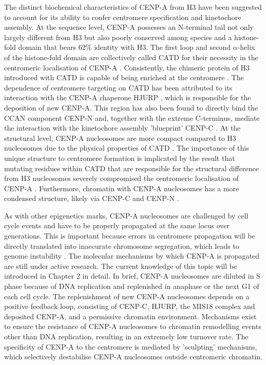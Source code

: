 The distinct biochemical characteristics of CENP-A from H3 have been suggested to account for its ability to confer centromere specification and kinetochore assembly. At the sequence level, CENP-A possesses an N-terminal tail not only largely different from H3 \citep{Sullivan1994HumanCentromere.} but also poorly conserved among species \citep{Goutte-Gattat2013PhosphorylationFunction} and a histone-fold domain that bears 62\% identity with H3. The first loop and second $\alpha$-helix of the histone-fold domain are collectively called CATD for their necessity in the centromeric localisation of CENP-A \citep{Black2007}. Consistently, the chimeric protein of H3 introduced with CATD is capable of being enriched at the centromere \citep{Black2007a}. The dependence of centromere targeting on CATD has been attributed to its interaction with the CENP-A chaperone HJURP \citep{Zhou2011StructuralScm3, Bassett2012, Hu2011StructureHJURP, Shuaib2010HJURPCentromeres}, which is responsible for the deposition of new CENP-A. This region has also been found to directly bind the CCAN component CENP-N \citep{Logsdon2015, Carroll2010, Carroll2009} and, together with the extreme C-terminus, mediate the interaction with the kinetochore assembly 'blueprint' CENP-C \citep{Carroll2010, Kato2013Spt6H3, Guse2011, Walstein2021}. At the structural level, CENP-A nucleosomes are more compact compared to H3 nucleosomes due to the physical properties of CATD \citep{Black2004, Sekulic2010}. The importance of this unique structure to centromere formation is implicated by the result that mutating residues within CATD that are responsible for the structural difference from H3 nucleosomes severely compromised the centromeric localisation of CENP-A \citep{Sekulic2010}. Furthermore, chromatin with CENP-A nucleosomes has a more condensed structure, likely via CENP-C and CENP-N \citep{Panchenko2011, Geiss2014, Zhou2022}. 

As with other epigenetics marks, CENP-A nucleosomes are challenged by cell cycle events and have to be properly propagated at the same locus over generations. This is important because errors in centromere propagation will be directly translated into inaccurate chromosome segregation, which leads to genome instability \citep{McClintock1939TheMeiosis, Koshland1987ACerevisiae}. The molecular mechanisms by which CENP-A is propagated are still under active research. The current knowledge of this topic will be introduced in Chapter 2 in detail. In brief, CENP-A nucleosomes are diluted in S phase because of DNA replication and replenished in anaphase or the next G1 of each cell cycle. The replenishment of new CENP-A nucleosomes depends on a positive feedback loop, consisting of CENP-C, HJURP, the MIS18 complex and deposited CENP-A, and a permissive chromatin environment. Mechanisms exist to ensure the resistance of CENP-A nucleosomes to chromatin remodelling events other than DNA replication, resulting in an extremely low turnover rate. The specificity of CENP-A to the centromere is mediated by 'sculpting' mechanisms, which selectively destabilise CENP-A nucleosomes outside centromeric chromatin. 

